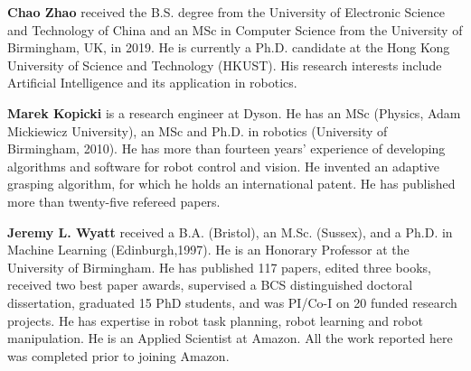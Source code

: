 \documentclass{ws-ijhr}
\begin{document}
\vspace*{13pt}  
\noindent%
\parbox{5truein}{
\begin{minipage}[b]{1truein}
\centerline{{}}
\end{minipage}
\hfill %
\begin{minipage}[b]{3.85truein}
{{\bf Chao Zhao} received the B.S. degree from the University of Electronic Science and Technology of China and an MSc in Computer Science from the University of Birmingham, UK, in 2019. He is currently a Ph.D. candidate at the Hong Kong University of Science and Technology (HKUST). His research interests include Artificial Intelligence and its application in robotics.\hfilneg}
\end{minipage}} %


\vspace*{13pt}  
\noindent%
\parbox{5truein}{
\begin{minipage}[b]{1truein}
\centerline{{}}
\end{minipage}
\hfill %
\begin{minipage}[b]{3.85truein}
{{\bf Marek Kopicki} is a research engineer at Dyson. He has an MSc (Physics, Adam Mickiewicz University), an MSc and Ph.D. in robotics (University of Birmingham, 2010). He has more than fourteen years’ experience of developing algorithms and software for robot control and vision. He invented an adaptive grasping algorithm, for which he holds an international patent. He has published more than twenty-five refereed papers.\hfilneg}
\end{minipage}} %

\vspace*{13pt}  
\noindent%
\parbox{5truein}{
\begin{minipage}[b]{1truein}
\centerline{{}}
\end{minipage}
\hfill %
\begin{minipage}[b]{3.85truein}
{{\bf Jeremy L. Wyatt} received a B.A. (Bristol), an M.Sc. (Sussex), and a Ph.D. in Machine Learning (Edinburgh,1997). He is an Honorary Professor at the University of Birmingham. He has published 117 papers, edited three books, received two best paper awards, supervised a BCS distinguished doctoral dissertation, graduated 15 PhD students, and was PI/Co-I on 20 funded research projects. He has expertise in robot task planning, robot learning and robot manipulation. He is an Applied Scientist at Amazon. All the work reported here was completed prior to joining Amazon. \hfilneg}
\end{minipage}} %


\vfill\eject
\end{document}
